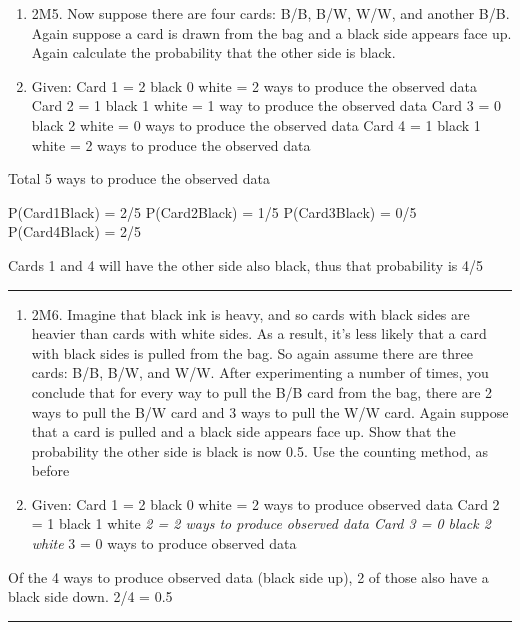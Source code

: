 \documentclass[
]{article}
\begin{document}
\begin{enumerate}
\def\labelenumi{\Alph{enumi})}
\setcounter{enumi}{16}
\item
  2M5. Now suppose there are four cards: B/B, B/W, W/W, and another B/B.
  Again suppose a card is drawn from the bag and a black side appears
  face up. Again calculate the probability that the other side is black.
\item
  Given: Card 1 = 2 black 0 white = 2 ways to produce the observed data
  Card 2 = 1 black 1 white = 1 way to produce the observed data Card 3 =
  0 black 2 white = 0 ways to produce the observed data Card 4 = 1 black
  1 white = 2 ways to produce the observed data
\end{enumerate}

Total 5 ways to produce the observed data

P(Card1\textbar Black) = 2/5 P(Card2\textbar Black) = 1/5
P(Card3\textbar Black) = 0/5 P(Card4\textbar Black) = 2/5

Cards 1 and 4 will have the other side also black, thus that probability
is 4/5

\begin{center}\rule{0.5\linewidth}{0.5pt}\end{center}

\begin{enumerate}
\def\labelenumi{\Alph{enumi})}
\setcounter{enumi}{16}
\item
  2M6. Imagine that black ink is heavy, and so cards with black sides
  are heavier than cards with white sides. As a result, it's less likely
  that a card with black sides is pulled from the bag. So again assume
  there are three cards: B/B, B/W, and W/W. After experimenting a number
  of times, you conclude that for every way to pull the B/B card from
  the bag, there are 2 ways to pull the B/W card and 3 ways to pull the
  W/W card. Again suppose that a card is pulled and a black side appears
  face up. Show that the probability the other side is black is now 0.5.
  Use the counting method, as before
\item
  Given: Card 1 = 2 black 0 white = 2 ways to produce observed data Card
  2 = 1 black 1 white \emph{2 = 2 ways to produce observed data Card 3 =
  0 black 2 white } 3 = 0 ways to produce observed data
\end{enumerate}

Of the 4 ways to produce observed data (black side up), 2 of those also
have a black side down. 2/4 = 0.5

\begin{center}\rule{0.5\linewidth}{0.5pt}\end{center}
\end{document}
